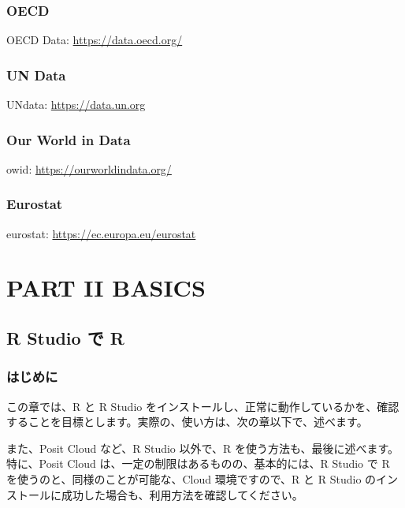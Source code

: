 \documentclass[
  xelatex, ja=standard]{bxjsbook}
\theoremstyle{definition}
\theoremstyle{definition}
\theoremstyle{definition}
\theoremstyle{definition}
\theoremstyle{remark}
\begin{document}
\hypertarget{oecd}{%
\section{OECD}\label{oecd}}

OECD Data: \url{https://data.oecd.org/}

\hypertarget{un-data}{%
\section{UN Data}\label{un-data}}

UNdata: \url{https://data.un.org}

\hypertarget{our-world-in-data}{%
\section{Our World in Data}\label{our-world-in-data}}

owid: \url{https://ourworldindata.org/}

\hypertarget{eurostat}{%
\section{Eurostat}\label{eurostat}}

eurostat: \url{https://ec.europa.eu/eurostat}

\hypertarget{part-part-ii-basics}{%
\part{PART II BASICS}\label{part-part-ii-basics}}

\hypertarget{ronrstudio}{%
\chapter{R Studio で R}\label{ronrstudio}}

\hypertarget{ux306fux3058ux3081ux306b}{%
\section{はじめに}\label{ux306fux3058ux3081ux306b}}

この章では、R と R Studio をインストールし、正常に動作しているかを、確認することを目標とします。実際の、使い方は、次の章以下で、述べます。

また、Posit Cloud など、R Studio 以外で、R を使う方法も、最後に述べます。特に、Posit Cloud は、一定の制限はあるものの、基本的には、R Studio で R を使うのと、同様のことが可能な、Cloud 環境ですので、R と R Studio のインストールに成功した場合も、利用方法を確認してください。
\end{document}
